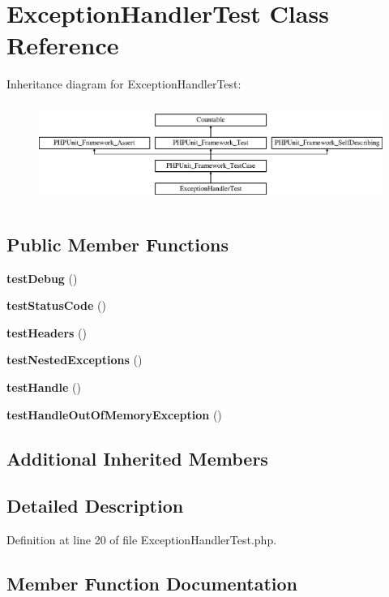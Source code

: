 \section{Exception\+Handler\+Test Class Reference}
\label{class_symfony_1_1_component_1_1_debug_1_1_tests_1_1_exception_handler_test}
Inheritance diagram for Exception\+Handler\+Test\+:\begin{figure}[H]
\begin{center}
\leavevmode
\includegraphics[height=3.303835cm]{class_symfony_1_1_component_1_1_debug_1_1_tests_1_1_exception_handler_test}
\end{center}
\end{figure}
\subsection*{Public Member Functions}
\begin{DoxyCompactItemize}
\item 
{\bf test\+Debug} ()
\item 
{\bf test\+Status\+Code} ()
\item 
{\bf test\+Headers} ()
\item 
{\bf test\+Nested\+Exceptions} ()
\item 
{\bf test\+Handle} ()
\item 
{\bf test\+Handle\+Out\+Of\+Memory\+Exception} ()
\end{DoxyCompactItemize}
\subsection*{Additional Inherited Members}


\subsection{Detailed Description}


Definition at line 20 of file Exception\+Handler\+Test.\+php.



\subsection{Member Function Documentation}

